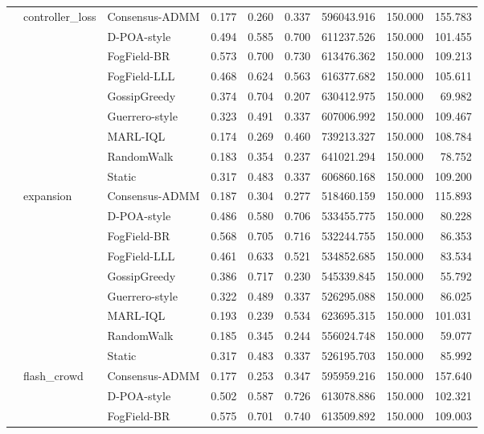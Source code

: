 \begin{table}
\begin{tabular}{lllrrrrrr}
\cline{2-9}
 & \multirow[t]{9}{*}{controller\_loss} & Consensus-ADMM & 0.177 & 0.260 & 0.337 & 596043.916 & 150.000 & 155.783 \\
 &  & D-POA-style & 0.494 & 0.585 & 0.700 & 611237.526 & 150.000 & 101.455 \\
 &  & FogField-BR & 0.573 & 0.700 & 0.730 & 613476.362 & 150.000 & 109.213 \\
 &  & FogField-LLL & 0.468 & 0.624 & 0.563 & 616377.682 & 150.000 & 105.611 \\
 &  & GossipGreedy & 0.374 & 0.704 & 0.207 & 630412.975 & 150.000 & 69.982 \\
 &  & Guerrero-style & 0.323 & 0.491 & 0.337 & 607006.992 & 150.000 & 109.467 \\
 &  & MARL-IQL & 0.174 & 0.269 & 0.460 & 739213.327 & 150.000 & 108.784 \\
 &  & RandomWalk & 0.183 & 0.354 & 0.237 & 641021.294 & 150.000 & 78.752 \\
 &  & Static & 0.317 & 0.483 & 0.337 & 606860.168 & 150.000 & 109.200 \\
\cline{2-9}
 & \multirow[t]{9}{*}{expansion} & Consensus-ADMM & 0.187 & 0.304 & 0.277 & 518460.159 & 150.000 & 115.893 \\
 &  & D-POA-style & 0.486 & 0.580 & 0.706 & 533455.775 & 150.000 & 80.228 \\
 &  & FogField-BR & 0.568 & 0.705 & 0.716 & 532244.755 & 150.000 & 86.353 \\
 &  & FogField-LLL & 0.461 & 0.633 & 0.521 & 534852.685 & 150.000 & 83.534 \\
 &  & GossipGreedy & 0.386 & 0.717 & 0.230 & 545339.845 & 150.000 & 55.792 \\
 &  & Guerrero-style & 0.322 & 0.489 & 0.337 & 526295.088 & 150.000 & 86.025 \\
 &  & MARL-IQL & 0.193 & 0.239 & 0.534 & 623695.315 & 150.000 & 101.031 \\
 &  & RandomWalk & 0.185 & 0.345 & 0.244 & 556024.748 & 150.000 & 59.077 \\
 &  & Static & 0.317 & 0.483 & 0.337 & 526195.703 & 150.000 & 85.992 \\
\cline{2-9}
 & \multirow[t]{9}{*}{flash\_crowd} & Consensus-ADMM & 0.177 & 0.253 & 0.347 & 595959.216 & 150.000 & 157.640 \\
 &  & D-POA-style & 0.502 & 0.587 & 0.726 & 613078.886 & 150.000 & 102.321 \\
 &  & FogField-BR & 0.575 & 0.701 & 0.740 & 613509.892 & 150.000 & 109.003 \\

\end{tabular}
\end{table}
